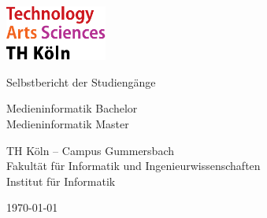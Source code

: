 
\begin{titlepage}

	\includegraphics[width=0.25\textwidth]{../../../assets/logo_th_koeln.pdf}

	\vspace{2cm}
	{\Large\raggedright Selbstbericht der Studiengänge\par}
	\vspace{-1cm}
	{\Huge\singlespacing Medieninformatik Bachelor \\ Medieninformatik Master \par}
	\vspace{1cm}
	{\Large TH Köln – Campus Gummersbach \\ Fakultät für Informatik und Ingenieurwissenschaften \\ Institut für Informatik\par}

	\vfill

	{\large \today\par}
\end{titlepage}
